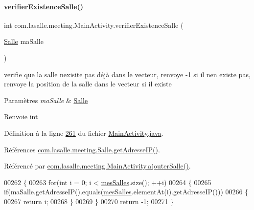 \paragraph{\texorpdfstring{verifier\+Existence\+Salle()}{verifierExistenceSalle()}\hspace{0.1cm}{\footnotesize\ttfamily [1/2]}}
{\footnotesize\ttfamily int com.\+lasalle.\+meeting.\+Main\+Activity.\+verifier\+Existence\+Salle (\begin{DoxyParamCaption}\item[{\hyperlink{classcom_1_1lasalle_1_1meeting_1_1_salle}{Salle}}]{ma\+Salle }\end{DoxyParamCaption})}



verifie que la salle n\textquotesingle{}exisite pas déjà dans le vecteur, r\textquotesingle{}envoye -\/1 si il n\textquotesingle{}en existe pas, r\textquotesingle{}envoye la position de la salle dans le vecteur si il existe 


\begin{DoxyParams}{Paramètres}
{\em ma\+Salle} & \hyperlink{classcom_1_1lasalle_1_1meeting_1_1_salle}{Salle} \\
\hline
\end{DoxyParams}
\begin{DoxyReturn}{Renvoie}
int 
\end{DoxyReturn}


Définition à la ligne \hyperlink{_main_activity_8java_source_l00261}{261} du fichier \hyperlink{_main_activity_8java_source}{Main\+Activity.\+java}.



Références \hyperlink{_salle_8java_source_l00285}{com.\+lasalle.\+meeting.\+Salle.\+get\+Adresse\+I\+P()}.



Référencé par \hyperlink{_main_activity_8java_source_l00239}{com.\+lasalle.\+meeting.\+Main\+Activity.\+ajouter\+Salle()}.


\begin{DoxyCode}
00262     \{
00263         \textcolor{keywordflow}{for}(\textcolor{keywordtype}{int} i = 0; i < \hyperlink{classcom_1_1lasalle_1_1meeting_1_1_main_activity_ab13e34516d877abc3ba937505b441979}{mesSalles}.size(); ++i)
00264         \{
00265             \textcolor{keywordflow}{if}(maSalle.getAdresseIP().equals(\hyperlink{classcom_1_1lasalle_1_1meeting_1_1_main_activity_ab13e34516d877abc3ba937505b441979}{mesSalles}.elementAt(i).getAdresseIP()))
00266             \{
00267                 \textcolor{keywordflow}{return} i;
00268             \}
00269         \}
00270         \textcolor{keywordflow}{return} -1;
00271     \}
\end{DoxyCode}
\mbox{\label{classcom_1_1lasalle_1_1meeting_1_1_main_activity_ac505af5465f0d95b1232acb745c86a08}} 
